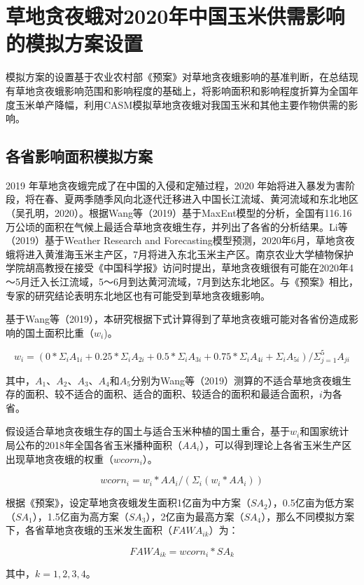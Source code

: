 \documentclass{progbookcn}
\begin{document}
\section{草地贪夜蛾对2020年中国玉米供需影响的模拟方案设置}
模拟方案的设置基于农业农村部《预案》对草地贪夜蛾影响的基准判断，在总结现有草地贪夜蛾影响范围和影响程度的基础上，将影响面积和影响程度折算为全国年度玉米单产降幅，利用CASM模拟草地贪夜蛾对我国玉米和其他主要作物供需的影响。

\subsection{各省影响面积模拟方案}
2019 年草地贪夜蛾完成了在中国的入侵和定殖过程，2020 年始将进入暴发为害阶段，将在春、夏两季随季风向北逐代迁移进入中国长江流域、黄河流域和东北地区（吴孔明，2020）。根据Wang等（2019）基于MaxEnt模型的分析，全国有116.16万公顷的面积在气候上最适合草地贪夜蛾生存，并列出了各省的分析结果。Li等（2019）基于Weather Research and Forecasting模型预测，2020年6月，草地贪夜蛾将进入黄淮海玉米主产区，7月将进入东北玉米主产区。南京农业大学植物保护学院胡高教授在接受《中国科学报》访问时提出，草地贪夜蛾很有可能在2020年4～5月迁入长江流域，5～6月到达黄河流域，7月到达东北地区。与《预案》相比，专家的研究结论表明东北地区也有可能受到草地贪夜蛾影响。

基于Wang等（2019），本研究根据下式计算得到了草地贪夜蛾可能对各省份造成影响的国土面积比重（$w_i$)。

\[w_i=(0*\Sigma_iA_{1i}+0.25*\Sigma_iA_{2i}+0.5*\Sigma_iA_{3i}+0.75*\Sigma_iA_{4i}+\Sigma_iA_{5i})/\Sigma_{j=1}^5A_{ji}\]

其中，$A_1$、$A_2$、$A_3$、$A_4$和$A_5$分别为Wang等（2019）测算的不适合草地贪夜蛾生存的面积、较不适合的面积、适合的面积、较适合的面积和最适合面积，$i$为各省。

假设适合草地贪夜蛾生存的国土与适合玉米种植的国土重合，基于$w_i$和国家统计局公布的2018年全国各省玉米播种面积（$AA_i$），可以得到理论上各省玉米生产区出现草地贪夜蛾的权重（$wcorn_i$）。

\[wcorn_i=w_i*AA_i/(\Sigma_i (w_i*AA_i))\]

根据《预案》，设定草地贪夜蛾发生面积1亿亩为中方案（$SA_2$），0.5亿亩为低方案（$SA_1$），1.5亿亩为高方案（$SA_3$），2亿亩为最高方案（$SA_4$），那么不同模拟方案下，各省草地贪夜蛾的玉米发生面积（$FAWA_{ik}$）为：

\[FAWA_{ik}=wcorn_i*SA_k\]

其中，$k=1,2,3,4$。
\end{document}
